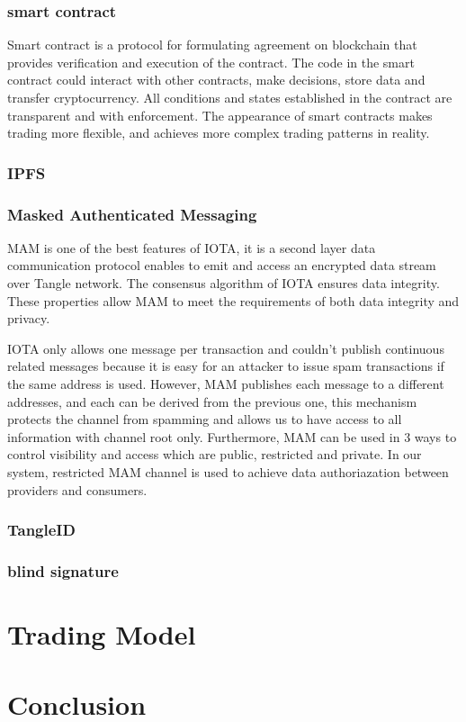 \documentclass[journal,a4paper]{IEEEtran}
\begin{document}
\subsubsection{smart contract}
Smart contract\cite{smartContract} is a protocol for formulating agreement on blockchain that provides verification and execution of the contract. The code in the smart contract could interact with other contracts, make decisions, store data and transfer cryptocurrency. All conditions and states established in the contract are transparent and with enforcement. The appearance of smart contracts makes trading more flexible, and achieves more complex trading patterns in reality.

\subsubsection{IPFS}

\subsubsection{Masked Authenticated Messaging}
MAM\cite{MAM} is one of the best features of IOTA, it is a second layer data communication protocol enables to emit and access an encrypted data stream over Tangle network. The consensus algorithm of IOTA ensures data integrity. These properties allow MAM to meet the requirements of both data integrity and privacy.

IOTA only allows one message per transaction and couldn't publish continuous related messages because it is easy for an attacker to issue spam transactions if the same address is used. However, MAM publishes each message to a different addresses, and each can be derived from the previous one, this mechanism protects the channel from spamming and allows us to have access to all information with channel root only. Furthermore, MAM can be used in 3 ways to control visibility and access which are public, restricted and private. In our system, restricted MAM channel is used to achieve data authoriazation between providers and consumers.

\subsubsection{TangleID}

\subsubsection{blind signature}


\section{Trading Model}

\section{Conclusion}



  







\end{document}
